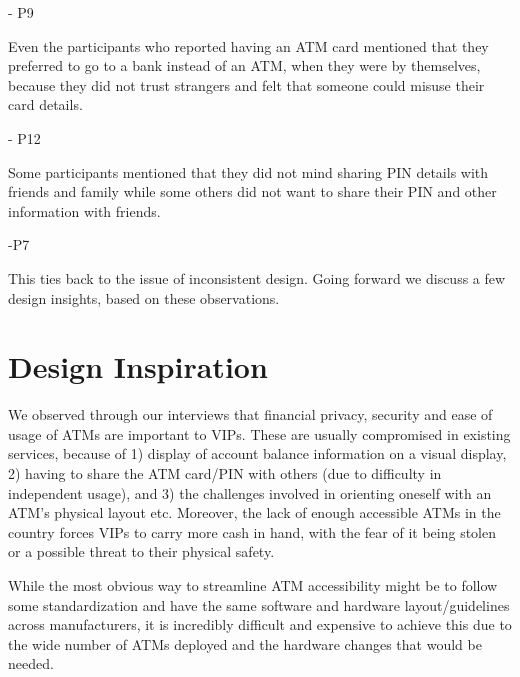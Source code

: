 \textcolor{quotegray}{ - P9}

Even the participants who reported having an ATM card mentioned that they preferred to go to a bank instead of an ATM, when they were by themselves, because they did not trust strangers and felt that someone could misuse their card details.

\textcolor{quotegray}{ - P12}

Some participants mentioned that they did not mind sharing PIN details with friends and family while some others did not want to share their PIN and other information with friends.

\textcolor{quotegray}{ -P7}

This ties back to the issue of inconsistent design. Going forward we discuss a few design insights, based on these observations.

\section{Design Inspiration}
\label{sec:designinspiration}

We observed through our interviews that financial privacy, security and ease of usage of ATMs are important to VIPs. These are usually compromised in existing services, because of 1) display of account balance information on a visual display, 2) having to share the ATM card/PIN with others (due to difficulty in independent usage), and 3) the challenges involved in orienting oneself with an ATM's physical layout etc. Moreover, the lack of enough accessible ATMs in the country forces VIPs to carry more cash in hand, with the fear of it being stolen or a possible threat to their physical safety.  

While the most obvious way to streamline ATM accessibility might be to follow some standardization and have the same software and hardware layout/guidelines across manufacturers, it is incredibly difficult and expensive to achieve this due to the wide number of ATMs deployed and the hardware changes that would be needed.

